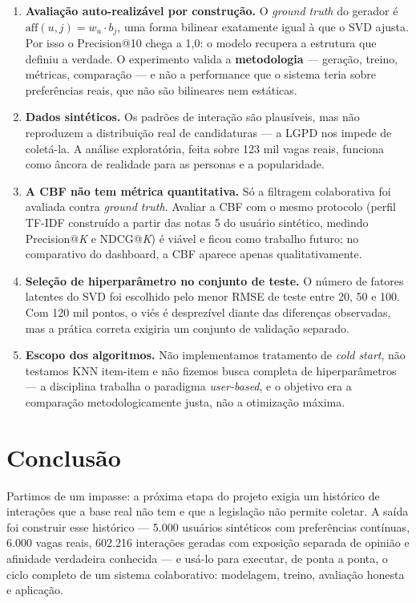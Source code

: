 \documentclass[12pt,a4paper]{article}
\begin{document}
\begin{enumerate}
    \item \textbf{Avaliação auto-realizável por construção.} O \textit{ground truth} do gerador é $\text{aff}(u,j) = w_u \cdot b_j$, uma forma bilinear exatamente igual à que o SVD ajusta. Por isso o Precision@10 chega a 1,0: o modelo recupera a estrutura que definiu a verdade. O experimento valida a \textbf{metodologia} --- geração, treino, métricas, comparação --- e não a performance que o sistema teria sobre preferências reais, que não são bilineares nem estáticas.
    \item \textbf{Dados sintéticos.} Os padrões de interação são plausíveis, mas não reproduzem a distribuição real de candidaturas --- a LGPD nos impede de coletá-la. A análise exploratória, feita sobre 123 mil vagas reais, funciona como âncora de realidade para as personas e a popularidade.
    \item \textbf{A CBF não tem métrica quantitativa.} Só a filtragem colaborativa foi avaliada contra \textit{ground truth}. Avaliar a CBF com o mesmo protocolo (perfil TF-IDF construído a partir das notas 5 do usuário sintético, medindo Precision@\textit{K} e NDCG@\textit{K}) é viável e ficou como trabalho futuro; no comparativo do dashboard, a CBF aparece apenas qualitativamente.
    \item \textbf{Seleção de hiperparâmetro no conjunto de teste.} O número de fatores latentes do SVD foi escolhido pelo menor RMSE de teste entre 20, 50 e 100. Com 120 mil pontos, o viés é desprezível diante das diferenças observadas, mas a prática correta exigiria um conjunto de validação separado.
    \item \textbf{Escopo dos algoritmos.} Não implementamos tratamento de \textit{cold start}, não testamos KNN item-item e não fizemos busca completa de hiperparâmetros --- a disciplina trabalha o paradigma \textit{user-based}, e o objetivo era a comparação metodologicamente justa, não a otimização máxima.
\end{enumerate}

\section{Conclusão}

Partimos de um impasse: a próxima etapa do projeto exigia um histórico de interações que a base real não tem e que a legislação não permite coletar. A saída foi construir esse histórico --- 5.000 usuários sintéticos com preferências contínuas, 6.000 vagas reais, 602.216 interações geradas com exposição separada de opinião e afinidade verdadeira conhecida --- e usá-lo para executar, de ponta a ponta, o ciclo completo de um sistema colaborativo: modelagem, treino, avaliação honesta e aplicação.
\end{document}
